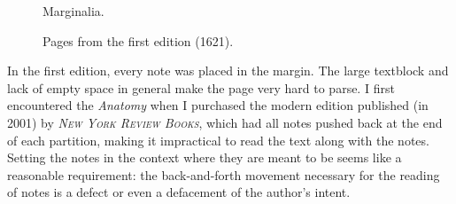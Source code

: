 \begin{figure}[H]
\begin{minipage}{0.3\textwidth}
    \caption*{\scriptsize{}\notefont{}Marginalia.}
  \end{minipage}%
  \caption*{Pages from the first edition (1621).}%
  \label{fig:first-edition}%
\end{figure}

In the first edition, every note was placed in the margin. The large textblock and lack of empty space in general make the page very hard to parse. I first encountered the \emph{Anatomy} when I purchased the modern edition published (in 2001) by \emph{\textsc{New York Review Books}}, which had all notes pushed back at the end of each partition, making it impractical to read the text along with the notes. Setting the notes in the context where they are meant to be seems like a reasonable requirement: the back-and-forth movement necessary for the reading of notes is a defect or even a defacement of the author's intent.

